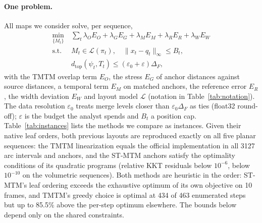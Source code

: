 \documentclass[review]{vgtc}                 %
\newcommand{\dtop}{d_{\mathrm{top}}}
\begin{document}
\paragraph{One problem.} All maps we consider solve, per sequence,
\begin{equation}\label{eq:problem}
\begin{aligned}
\min_{\{M_t\}}\ &\textstyle\sum_t \lambda_O E_O+\lambda_G E_G+\lambda_M E_M+\lambda_R E_R+\lambda_W E_W\\
\text{s.t. }&M_t\in\mathcal{L}(\pi_t),\quad \|x_t-q_t\|_\infty\le B_t,\\
&\dtop(\psi_t,T_t)\le(\varepsilon_0+\varepsilon)\Delta_F ,
\end{aligned}
\end{equation}
with the TMTM overlap term $E_O$, the stress $E_G$ of anchor distances against source distances, a temporal term $E_M$ on matched anchors, the reference error $E_R$, the width deviation $E_W$ and layout model $\mathcal{L}$ (notation in Table~\ref{tab:notation}). The data resolution $\varepsilon_0$ treats merge levels closer than $\varepsilon_0\Delta_F$ as ties (float32 round-off); $\varepsilon$ is the budget the analyst spends and $B_t$ a position cap. Table~\ref{tab:instances} lists the methods we compare as instances. Given their native leaf orders, both previous layouts are reproduced exactly on all five planar sequences: the TMTM linearization equals the official implementation in all 3127 arc intervals and anchors, and the ST-MTM anchors satisfy the optimality conditions of its quadratic programs (relative KKT residuals below $10^{-6}$, below $10^{-10}$ on the volumetric sequences). Both methods are heuristic in the order: ST-MTM's leaf ordering exceeds the exhaustive optimum of its own objective on 10 frames, and TMTM's greedy choice is optimal at 434 of 463 enumerated steps but up to 85.5\% above the per-step optimum elsewhere. The bounds below depend only on the shared constraints.
\end{document}
